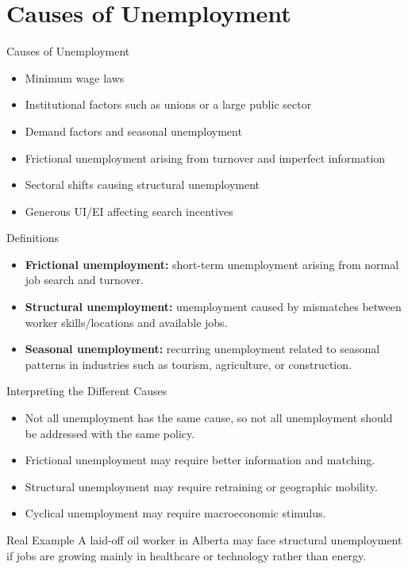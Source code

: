 \documentclass[aspectratio=169]{beamer}
\begin{document}
\section{Causes of Unemployment}

\begin{frame}{Causes of Unemployment}
\transfade
\begin{itemize}[<+->]
  \item Minimum wage laws
  \item Institutional factors such as unions or a large public sector
  \item Demand factors and seasonal unemployment
  \item Frictional unemployment arising from turnover and imperfect information
  \item Sectoral shifts causing structural unemployment
  \item Generous UI/EI affecting search incentives
\end{itemize}

\begin{block}{Definitions}
\begin{itemize}[<+->]
  \item \textbf{Frictional unemployment:} short-term unemployment arising from normal job search and turnover.
  \item \textbf{Structural unemployment:} unemployment caused by mismatches between worker skills/locations and available jobs.
  \item \textbf{Seasonal unemployment:} recurring unemployment related to seasonal patterns in industries such as tourism, agriculture, or construction.
\end{itemize}
\end{block}
\end{frame}

\begin{frame}{Interpreting the Different Causes}
\transfade
\begin{itemize}[<+->]
  \item Not all unemployment has the same cause, so not all unemployment should be addressed with the same policy.
  \item Frictional unemployment may require better information and matching.
  \item Structural unemployment may require retraining or geographic mobility.
  \item Cyclical unemployment may require macroeconomic stimulus.
\end{itemize}

\begin{exampleblock}{Real Example}
A laid-off oil worker in Alberta may face structural unemployment if jobs are growing mainly in healthcare or technology rather than energy.
\end{exampleblock}
\end{frame}
\end{document}
